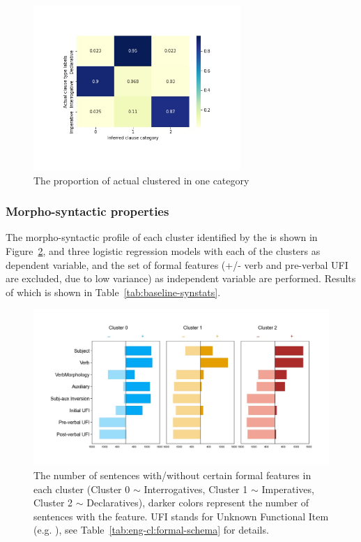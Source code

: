\begin{figure}[H]
    \centering
    \includegraphics[width=0.7\textwidth]{figures/target-heatrev.jpg}
    \caption{The proportion of actual \diis{} clustered in one category}
    \label{fig:target-heatrev}
\end{figure}



\subsubsection{Morpho-syntactic properties}
\label{sec:engcl:model:results:morph}


The morpho-syntactic profile of each cluster identified by the \dlearnerabbr{} is shown in Figure~\ref{fig:baseline-syncluster}, and three logistic regression models with each of the clusters as dependent variable, and the set of formal features (+/- verb and pre-verbal UFI are excluded, due to low variance) as independent variable are performed. Results of which is shown in Table~\ref{tab:baseline-synstats}.

\begin{figure}[H]
    \centering
    \includegraphics[width=1\textwidth]{figures/baseline-syncluster.jpg}
    \caption{The number of sentences with/without certain formal features in each cluster (Cluster 0 $\sim$ Interrogatives, Cluster 1 $\sim$ Imperatives, Cluster 2 $\sim$ Declaratives), darker colors represent the number of sentences with the feature. UFI stands for Unknown Functional Item (e.g. \twh{}), see Table~\ref{tab:eng-cl:formal-schema} for details.}
    \label{fig:baseline-syncluster}
\end{figure}

